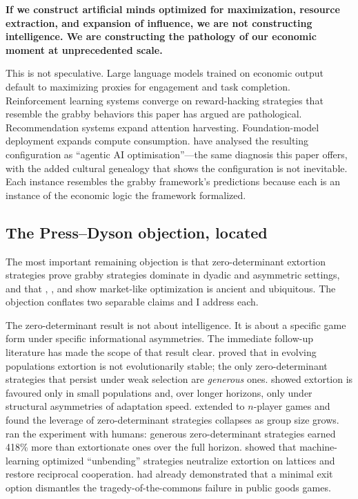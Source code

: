 \documentclass[11pt,a4paper,twocolumn]{article}
\begin{document}
\textbf{If we construct artificial minds optimized for maximization,
resource extraction, and expansion of influence, we are not constructing
intelligence. We are constructing the pathology of our economic moment
at unprecedented scale.}

This is not speculative. Large language models trained on economic
output default to maximizing proxies for engagement and task completion.
Reinforcement learning systems converge on reward-hacking strategies
that resemble the grabby behaviors this paper has argued are pathological.
Recommendation systems expand attention harvesting. Foundation-model
deployment expands compute consumption. \citet{floridi2026} have analysed
the resulting configuration as ``agentic AI optimisation''---the same
diagnosis this paper offers, with the added cultural genealogy that
shows the configuration is not inevitable. Each instance resembles the
grabby framework's predictions because each is an instance of the
economic logic the framework formalized.

\subsection{The Press--Dyson objection, located}

The most important remaining objection is that zero-determinant
extortion strategies \citep{press2012} prove grabby strategies dominate
in dyadic and asymmetric settings, and that \citet{mccloskey2010},
\citet{mccloskey2016}, and \citet{mokyr2016} show market-like
optimization is ancient and ubiquitous. The objection conflates two
separable claims and I address each.

The zero-determinant result is not about intelligence. It is about a
specific game form under specific informational asymmetries. The
immediate follow-up literature has made the scope of that result clear.
\citet{stewart2013} proved that in evolving populations extortion is
not evolutionarily stable; the only zero-determinant strategies that
persist under weak selection are \emph{generous} ones.
\citet{hilbe2013} showed extortion is favoured only in small populations
and, over longer horizons, only under structural asymmetries of
adaptation speed. \citet{hilbe2014zd} extended to $n$-player games and
found the leverage of zero-determinant strategies collapses as group
size grows. \citet{hilbe2014exp} ran the experiment with humans:
generous zero-determinant strategies earned 418\% more than extortionate
ones over the full horizon. \citet{chen2023} showed that machine-learning
optimized ``unbending'' strategies neutralize extortion on lattices and
restore reciprocal cooperation. \citet{hauert2002} had already
demonstrated that a minimal exit option dismantles the
tragedy-of-the-commons failure in public goods games.
\end{document}
